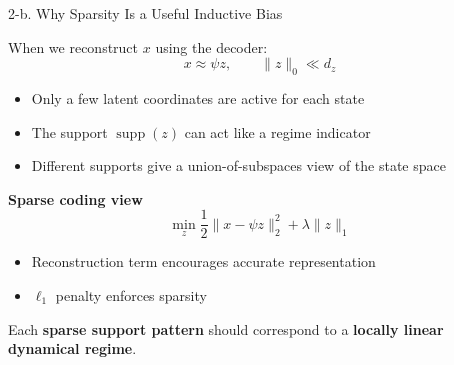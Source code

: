\documentclass[aspectratio=169, 10pt]{beamer}
\begin{document}
\begin{frame}{2-b. Why Sparsity Is a Useful Inductive Bias}

When we reconstruct $x$ using the decoder:
\[
x \approx \psi z, \qquad \|z\|_0 \ll d_z
\]

\begin{itemize}
\item Only a few latent coordinates are active for each state
\item The support $\operatorname{supp}(z)$ can act like a regime indicator
\item Different supports give a union-of-subspaces view of the state space
\end{itemize}

\vspace{0.3em}
\textbf{Sparse coding view}
\[
\min_z
\frac{1}{2}\|x - \psi z\|_2^2
+
\lambda \|z\|_1
\]

\begin{itemize}
\item Reconstruction term encourages accurate representation
\item $\ell_1$ penalty enforces sparsity
\end{itemize}


\vspace{0.2em}
Each \textbf{sparse support pattern} should correspond to a
\textbf{locally linear dynamical regime}.

\end{frame}
\end{document}
